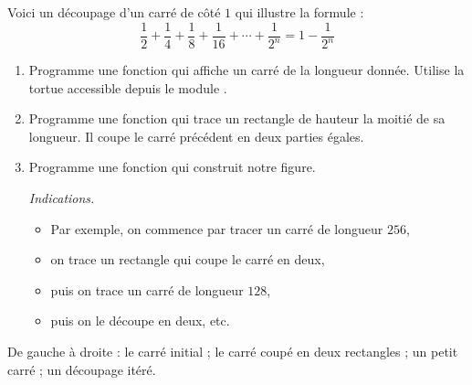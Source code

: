 \documentclass[11pt,class=report,crop=false]{standalone}
\begin{document}
\begin{activite}


Voici un découpage d'un carré de côté $1$ qui illustre la formule :
$$\frac12 + \frac14 + \frac18 + \frac1{16} + \cdots + \frac{1}{2^n}
= 1 - \frac{1}{2^n}$$


\begin{enumerate}
  \item Programme une fonction  qui affiche un carré de la longueur donnée. Utilise la tortue accessible depuis le module .
  
   
  \item Programme une fonction  qui trace un rectangle de hauteur la moitié de sa longueur. Il coupe le carré précédent en deux parties égales. 
  
  \item Programme une fonction  qui construit notre figure.
  
  \emph{Indications.}
  \begin{itemize}
    \item Par exemple, on commence par tracer un carré de longueur $256$,
    \item on trace un rectangle qui coupe le carré en deux,
    \item puis on trace un carré de longueur $128$,
    \item puis on le découpe en deux, etc.
  \end{itemize}
  
\end{enumerate} 

De gauche à droite : le carré initial ; le carré coupé en deux rectangles ; un petit carré ; un découpage itéré.


\end{activite}
\end{document}

